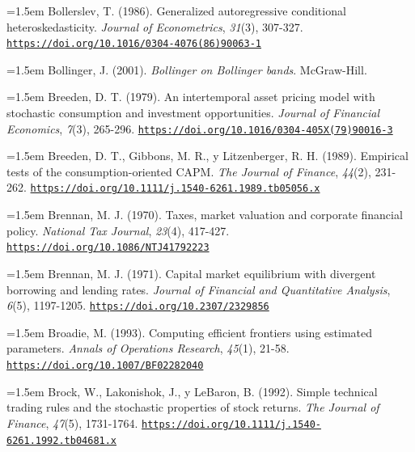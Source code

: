 \documentclass[10pt,a4paper]{article}
\begin{document}
\noindent\hangindent=1.5em Bollerslev, T. (1986). Generalized autoregressive conditional heteroskedasticity. \textit{Journal of Econometrics}, \textit{31}(3), 307-327. \href{https://doi.org/10.1016/0304-4076(86)90063-1}{\nolinkurl{https://doi.org/10.1016/0304-4076(86)90063-1}}

\noindent\hangindent=1.5em Bollinger, J. (2001). \textit{Bollinger on Bollinger bands}. McGraw-Hill.

\noindent\hangindent=1.5em Breeden, D. T. (1979). An intertemporal asset pricing model with stochastic consumption and investment opportunities. \textit{Journal of Financial Economics}, \textit{7}(3), 265-296. \href{https://doi.org/10.1016/0304-405X(79)90016-3}{\nolinkurl{https://doi.org/10.1016/0304-405X(79)90016-3}}

\noindent\hangindent=1.5em Breeden, D. T., Gibbons, M. R., y Litzenberger, R. H. (1989). Empirical tests of the consumption-oriented CAPM. \textit{The Journal of Finance}, \textit{44}(2), 231-262. \href{https://doi.org/10.1111/j.1540-6261.1989.tb05056.x}{\nolinkurl{https://doi.org/10.1111/j.1540-6261.1989.tb05056.x}}

{\sloppy\noindent\hangindent=1.5em Brennan, M. J. (1970). Taxes, market valuation and corporate financial policy. \textit{National Tax Journal}, \textit{23}(4), 417-427. \href{https://doi.org/10.1086/NTJ41792223}{\nolinkurl{https://doi.org/10.1086/NTJ41792223}}\par}

\noindent\hangindent=1.5em Brennan, M. J. (1971). Capital market equilibrium with divergent borrowing and lending rates. \textit{Journal of Financial and Quantitative Analysis}, \textit{6}(5), 1197-1205. \href{https://doi.org/10.2307/2329856}{\nolinkurl{https://doi.org/10.2307/2329856}}

\noindent\hangindent=1.5em Broadie, M. (1993). Computing efficient frontiers using estimated parameters. \textit{Annals of Operations Research}, \textit{45}(1), 21-58. \href{https://doi.org/10.1007/BF02282040}{\nolinkurl{https://doi.org/10.1007/BF02282040}}

\noindent\hangindent=1.5em Brock, W., Lakonishok, J., y LeBaron, B. (1992). Simple technical trading rules and the stochastic properties of stock returns. \textit{The Journal of Finance}, \textit{47}(5), 1731-1764. \href{https://doi.org/10.1111/j.1540-6261.1992.tb04681.x}{\nolinkurl{https://doi.org/10.1111/j.1540-6261.1992.tb04681.x}}
\end{document}

